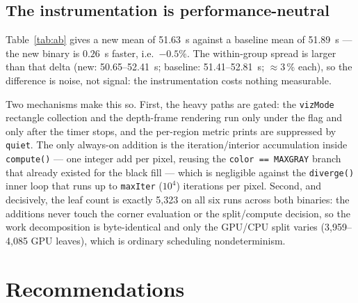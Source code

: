 \documentclass[
	english,
	letterpaper, oneside
]{article}
\begin{document}
\subsection{The instrumentation is performance-neutral}

Table~\ref{tab:ab} gives a new mean of 51.63~s against a baseline mean of
51.89~s --- the new binary is $0.26$~s faster, i.e.\ $-0.5\%$. The
within-group spread is larger than that delta (new: 50.65--52.41~s; baseline:
51.41--52.81~s; $\approx$3\,\% each), so the difference is noise, not signal:
the instrumentation costs nothing measurable.

Two mechanisms make this so. First, the heavy paths are gated: the
\texttt{vizMode} rectangle collection and the depth-frame rendering run only
under the flag and only after the timer stops, and the per-region metric prints
are suppressed by \texttt{quiet}. The only always-on addition is the
iteration/interior accumulation inside \texttt{compute()} --- one integer add
per pixel, reusing the \texttt{color == MAXGRAY} branch that already existed for
the black fill --- which is negligible against the \texttt{diverge()} inner loop
that runs up to \texttt{maxIter} ($10^4$) iterations per pixel. Second, and
decisively, the leaf count is exactly 5{,}323 on all six runs across
both binaries: the additions never touch the corner evaluation or the
split/compute decision, so the work decomposition is byte-identical and only the
GPU/CPU split varies (3{,}959--4{,}085 GPU leaves), which is ordinary scheduling
nondeterminism.

\section{Recommendations}
\end{document}
